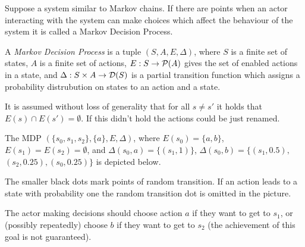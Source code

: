 Suppose a system similar to Markov chains.
If there are points when an actor interacting with the system can make
choices which affect the behaviour of the system it is called a Markov
Decision Process.

\begin{definition}
A {\em Markov Decision Process} is a tuple $(S, A, E, \Delta)$, where
$S$ is a finite set of states,
$A$ is a finite set of actions,
$E : S \to \mathcal{P}(A)$ gives the set of enabled actions in a state,
and $\Delta : S \times A \to \mathcal{D}(S)$ is a partial transition
function which assigns a probability distrubution on states to an action
and a state.

It is assumed without loss of generality that for all $s \neq s'$ it
holds that $E(s) \cap E(s') = \emptyset$. If this didn't hold the
actions could be just renamed.
\end{definition}

\begin{example} The MDP $(\{s_0, s_1, s_2\}, \{a\}, E, \Delta)$,
    where
    $E(s_0) = \{a,b\}$, $E(s_1) = E(s_2) = \emptyset$,
    and $\Delta(s_0, a) = \{(s_1, 1)\}$,
    $\Delta(s_0, b) = \{(s_1, 0.5),$ $(s_2,0.25), (s_0,0.25)\}$
    is depicted below.

    The smaller black dots mark points of random transition. If an
    action leads to a state with probability one the random transition
    dot is omitted in the picture.

    The actor making decisions should choose action $a$ if
    they want to get to $s_1$, or (possibly repeatedly) choose $b$ if
    they want to get to $s_2$ (the achievement of this goal is not
    guaranteed).

\hfill \break
\centering
{}

\end{example}

